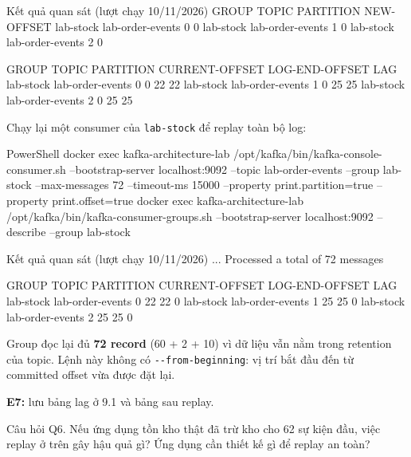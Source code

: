 \begin{aivnCodeOutput}{Kết quả quan sát (lượt chạy 10/11/2026)}
GROUP      TOPIC             PARTITION  NEW-OFFSET
lab-stock  lab-order-events  0          0
lab-stock  lab-order-events  1          0
lab-stock  lab-order-events  2          0

GROUP      TOPIC             PARTITION  CURRENT-OFFSET  LOG-END-OFFSET  LAG
lab-stock  lab-order-events  0          0               22              22
lab-stock  lab-order-events  1          0               25              25
lab-stock  lab-order-events  2          0               25              25
\end{aivnCodeOutput}

Chạy lại một consumer của \texttt{lab-\allowbreak{}stock} để replay toàn bộ log:


\begin{aivncodebox}[language={}]{PowerShell}
docker exec kafka-architecture-lab /opt/kafka/bin/kafka-console-consumer.sh --bootstrap-server localhost:9092 --topic lab-order-events --group lab-stock --max-messages 72 --timeout-ms 15000 --property print.partition=true --property print.offset=true
docker exec kafka-architecture-lab /opt/kafka/bin/kafka-consumer-groups.sh --bootstrap-server localhost:9092 --describe --group lab-stock
\end{aivncodebox}

\begin{aivnCodeOutput}{Kết quả quan sát (lượt chạy 10/11/2026)}
...
Processed a total of 72 messages

GROUP      TOPIC             PARTITION  CURRENT-OFFSET  LOG-END-OFFSET  LAG
lab-stock  lab-order-events  0          22              22              0
lab-stock  lab-order-events  1          25              25              0
lab-stock  lab-order-events  2          25              25              0
\end{aivnCodeOutput}

Group đọc lại đủ \textbf{72 record} (60 + 2 + 10) vì dữ liệu vẫn nằm trong retention của topic. Lệnh này không có \texttt{-\allowbreak{}-\allowbreak{}from-\allowbreak{}beginning}: vị trí bắt đầu đến từ committed offset vừa được đặt lại.


\begin{evidencebox}
\textbf{E7:} lưu bảng lag ở 9.1 và bảng sau replay.
\end{evidencebox}

\begin{questionbox}{Câu hỏi Q6.}
Nếu ứng dụng tồn kho thật đã trừ kho cho 62 sự kiện đầu, việc replay ở trên gây hậu quả gì? Ứng dụng cần thiết kế gì để replay an toàn?
\end{questionbox}

